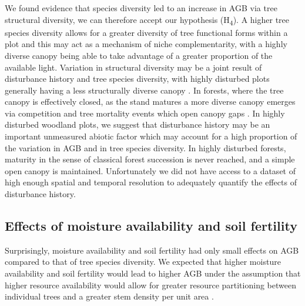 \documentclass[11pt,a4paper]{article}
\begin{document}
We found evidence that species diversity led to an increase in AGB via tree structural diversity, we can therefore accept our hypothesis (H\textsubscript{4}). A higher tree species diversity allows for a greater diversity of tree functional forms within a plot and this may act as a mechanism of niche complementarity, with a highly diverse canopy being able to take advantage of a greater proportion of the available light. Variation in structural diversity may be a joint result of disturbance history and tree species diversity, with highly disturbed plots generally having a less structurally diverse canopy \citep{LaRue2019}. In forests, where the tree canopy is effectively closed, as the stand matures a more diverse canopy emerges via competition and tree mortality events which open canopy gaps \citep{Muscolo2014}. In highly disturbed woodland plots, we suggest that disturbance history may be an important unmeasured abiotic factor which may account for a high proportion of the variation in AGB and in tree species diversity. In highly disturbed forests, maturity in the sense of classical forest succession is never reached, and a simple open canopy is maintained. Unfortunately we did not have access to a dataset of high enough spatial and temporal resolution to adequately quantify the effects of disturbance history. 

\subsection{Effects of moisture availability and soil fertility}

Surprisingly, moisture availability and soil fertility had only small effects on AGB compared to that of tree species diversity. We expected that higher moisture availability and soil fertility would lead to higher AGB under the assumption that higher resource availability would allow for greater resource partitioning between individual trees \citep{} and a greater stem density per unit area \citep{}.
\end{document}
